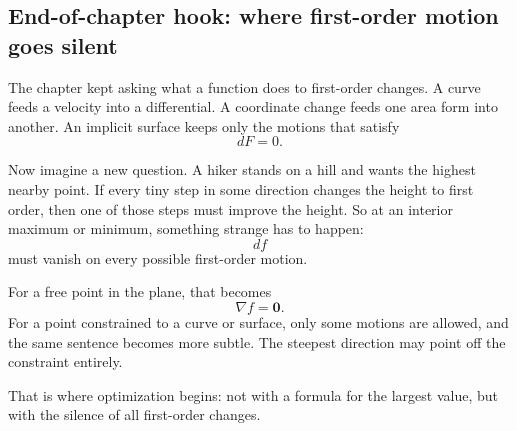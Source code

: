 \subsection{End-of-chapter hook: where first-order motion goes silent}

The chapter kept asking what a function does to first-order changes.  A curve feeds a
velocity into a differential.  A coordinate change feeds one area form into another.  An
implicit surface keeps only the motions that satisfy
\[
    dF=0.
\]

Now imagine a new question.  A hiker stands on a hill and wants the highest nearby
point.  If every tiny step in some direction changes the height to first order, then one of
those steps must improve the height.  So at an interior maximum or minimum, something
strange has to happen:
\[
    df
\]
must vanish on every possible first-order motion.

For a free point in the plane, that becomes
\[
    \nabla f=\mathbf 0.
\]
For a point constrained to a curve or surface, only some motions are allowed, and the
same sentence becomes more subtle.  The steepest direction may point off the constraint
entirely.

That is where optimization begins: not with a formula for the largest value, but with the
silence of all first-order changes.

